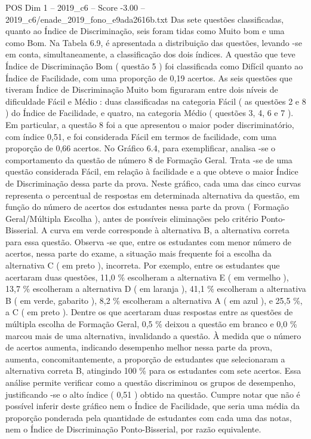 \begin{textsample}{POS Dim 1 – 2019\_c6 – Score -3.00 – 2019\_c6/enade\_2019\_fono\_e9ada2616b.txt}
Das sete questões classificadas, quanto ao Índice de Discriminação, seis foram tidas como Muito bom e uma como Bom.
Na Tabela 6.9, é apresentada a distribuição das questões, levando -se em conta, simultaneamente, a classificação dos dois índices.
A questão que teve Índice de Discriminação Bom ( questão 5 ) foi classificada como Difícil quanto ao Índice de Facilidade, com uma proporção de 0,19 acertos.
As seis questões que tiveram Índice de Discriminação Muito bom figuraram entre dois níveis de dificuldade Fácil e Médio : duas classificadas na categoria Fácil ( as questões 2 e 8 ) do Índice de Facilidade, e quatro, na categoria Médio ( questões 3, 4, 6 e 7 ).
Em particular, a questão 8 foi a que apresentou o maior poder discriminatório, com índice 0,51, e foi considerada Fácil em termos de facilidade, com uma proporção de 0,66 acertos.
No Gráfico 6.4, para exemplificar, analisa -se o comportamento da questão de número 8 de Formação Geral.
Trata -se de uma questão considerada Fácil, em relação à facilidade e a que obteve o maior Índice de Discriminação dessa parte da prova.
Neste gráfico, cada uma das cinco curvas representa o percentual de respostas em determinada alternativa da questão, em função do número de acertos dos estudantes nessa parte da prova ( Formação Geral/Múltipla Escolha ), antes de possíveis eliminações pelo critério Ponto-Bisserial.
A curva em verde corresponde à alternativa B, a alternativa correta para essa questão.
Observa -se que, entre os estudantes com menor número de acertos, nessa parte do exame, a situação mais frequente foi a escolha da alternativa C ( em preto ), incorreta.
Por exemplo, entre os estudantes que acertaram duas questões, 11,0 \% escolheram a alternativa E ( em vermelho ), 13,7 \% escolheram a alternativa D ( em laranja ), 41,1 \% escolheram a alternativa B ( em verde, gabarito ), 8,2 \% escolheram a alternativa A ( em azul ), e 25,5 \%, a C ( em preto ).
Dentre os que acertaram duas respostas entre as questões de múltipla escolha de Formação Geral, 0,5 \% deixou a questão em branco e 0,0 \% marcou mais de uma alternativa, invalidando a questão.
À medida que o número de acertos aumenta, indicando desempenho melhor nessa parte da prova, aumenta, concomitantemente, a proporção de estudantes que selecionaram a alternativa correta B, atingindo 100 \% para os estudantes com sete acertos.
Essa análise permite verificar como a questão discriminou os grupos de desempenho, justificando -se o alto índice ( 0,51 ) obtido na questão.
Cumpre notar que não é possível inferir deste gráfico nem o Índice de Facilidade, que seria uma média da proporção ponderada pela quantidade de estudantes com cada uma das notas, nem o Índice de Discriminação Ponto-Bisserial, por razão equivalente.

\end{textsample}
